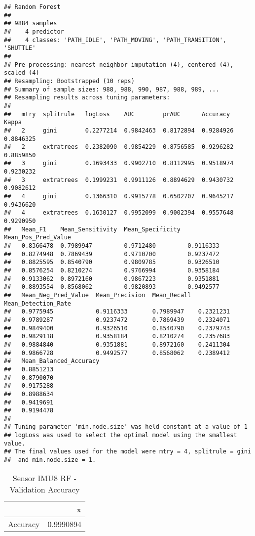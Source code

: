 \documentclass[]{article}
\begin{document}
\begin{verbatim}
## Random Forest 
## 
## 9884 samples
##    4 predictor
##    4 classes: 'PATH_IDLE', 'PATH_MOVING', 'PATH_TRANSITION', 'SHUTTLE' 
## 
## Pre-processing: nearest neighbor imputation (4), centered (4), scaled (4) 
## Resampling: Bootstrapped (10 reps) 
## Summary of sample sizes: 988, 988, 990, 987, 988, 989, ... 
## Resampling results across tuning parameters:
## 
##   mtry  splitrule   logLoss    AUC        prAUC      Accuracy   Kappa    
##   2     gini        0.2277214  0.9842463  0.8172894  0.9284926  0.8846325
##   2     extratrees  0.2382090  0.9854229  0.8756585  0.9296282  0.8859850
##   3     gini        0.1693433  0.9902710  0.8112995  0.9518974  0.9230232
##   3     extratrees  0.1999231  0.9911126  0.8894629  0.9430732  0.9082612
##   4     gini        0.1366310  0.9915778  0.6502707  0.9645217  0.9436620
##   4     extratrees  0.1630127  0.9952099  0.9002394  0.9557648  0.9290950
##   Mean_F1    Mean_Sensitivity  Mean_Specificity  Mean_Pos_Pred_Value
##   0.8366478  0.7989947         0.9712480         0.9116333          
##   0.8274948  0.7869439         0.9710700         0.9237472          
##   0.8825595  0.8540790         0.9809785         0.9326510          
##   0.8576254  0.8210274         0.9766994         0.9358184          
##   0.9133062  0.8972160         0.9867223         0.9351881          
##   0.8893554  0.8568062         0.9820893         0.9492577          
##   Mean_Neg_Pred_Value  Mean_Precision  Mean_Recall  Mean_Detection_Rate
##   0.9775945            0.9116333       0.7989947    0.2321231          
##   0.9789287            0.9237472       0.7869439    0.2324071          
##   0.9849400            0.9326510       0.8540790    0.2379743          
##   0.9829118            0.9358184       0.8210274    0.2357683          
##   0.9884840            0.9351881       0.8972160    0.2411304          
##   0.9866728            0.9492577       0.8568062    0.2389412          
##   Mean_Balanced_Accuracy
##   0.8851213             
##   0.8790070             
##   0.9175288             
##   0.8988634             
##   0.9419691             
##   0.9194478             
## 
## Tuning parameter 'min.node.size' was held constant at a value of 1
## logLoss was used to select the optimal model using the smallest value.
## The final values used for the model were mtry = 4, splitrule = gini
##  and min.node.size = 1.
\end{verbatim}

\begin{table}[!h]

\caption{\label{tab:sensor-rf-results}Sensor IMU8 RF - Validation Accuracy}
\centering
\begin{tabular}[t]{lr}
\toprule
  & x\\
\midrule
Accuracy & 0.9990894\\
\bottomrule
\end{tabular}
\end{table}
\end{document}
